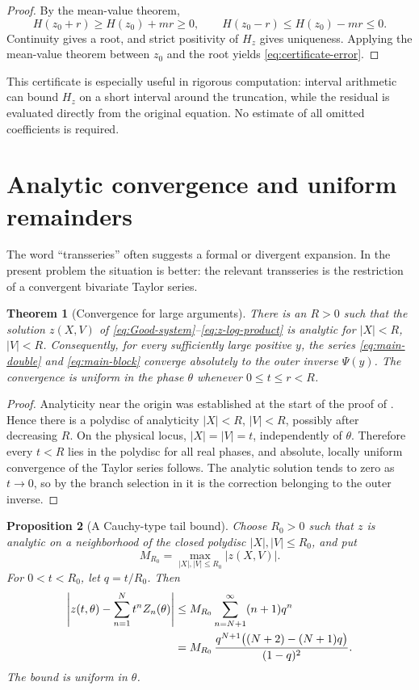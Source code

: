 \documentclass[11pt,oneside]{article}
\theoremstyle{plain}
\newtheorem{theorem}{Theorem}[section]
\newtheorem{proposition}[theorem]{Proposition}
\theoremstyle{definition}
\theoremstyle{remark}
\newcommand{\abs}[1]{\left\lvert#1\right\rvert}
\begin{document}
\begin{proof}
By the mean-value theorem,
\[
 H(z_0+r)\ge H(z_0)+mr\ge0,
 \qquad
 H(z_0-r)\le H(z_0)-mr\le0.
\]
Continuity gives a root, and strict positivity of \(H_z\) gives uniqueness.
Applying the mean-value theorem between \(z_0\) and the root yields
\eqref{eq:certificate-error}.
\end{proof}

This certificate is especially useful in rigorous computation: interval
arithmetic can bound \(H_z\) on a short interval around the truncation, while
the residual is evaluated directly from the original equation.  No estimate
of all omitted coefficients is required.

\section{Analytic convergence and uniform remainders}
\label{sec:convergence}

The word ``transseries'' often suggests a formal or divergent expansion.  In
the present problem the situation is better: the relevant transseries is the
restriction of a convergent bivariate Taylor series.

\begin{theorem}[Convergence for large arguments]
\label{thm:convergence}
There is an \(R>0\) such that the solution \(z(X,V)\) of
\eqref{eq:Good-system}--\eqref{eq:z-log-product} is analytic for
\(\abs X<R\), \(\abs V<R\).  Consequently, for every sufficiently large
positive \(y\), the series \eqref{eq:main-double} and
\eqref{eq:main-block} converge absolutely to the outer inverse \(\Psi(y)\).
The convergence is uniform in the phase \(\theta\) whenever
\(0\le t\le r<R\).
\end{theorem}

\begin{proof}
Analyticity near the origin was established at the start of the proof of
.  Hence there is a polydisc of analyticity
\(\abs X<R\), \(\abs V<R\), possibly after decreasing \(R\).  On the physical
locus, \(\abs X=\abs V=t\), independently of \(\theta\).  Therefore every
\(t<R\) lies in the polydisc for all real phases, and absolute, locally uniform
convergence of the Taylor series follows.  The analytic solution tends to
zero as \(t\to0\), so by the branch selection in
 it is the correction belonging to the outer
inverse.
\end{proof}

\begin{proposition}[A Cauchy-type tail bound]
\label{prop:Cauchy-tail}
Choose \(R_0>0\) such that \(z\) is analytic on a neighborhood of the closed
polydisc \(\abs X,\abs V\le R_0\), and put
\[
 M_{R_0}=\max_{\abs X,\abs V\le R_0}\abs{z(X,V)}.
\]
For \(0<t<R_0\), let \(q=t/R_0\).  Then
\begin{align}
 \left|z(t,\theta)-\sum_{n=1}^Nt^nZ_n(\theta)\right|
 &\le M_{R_0}\sum_{n=N+1}^{\infty}(n+1)q^n \notag\\
 &=M_{R_0}\,
 \frac{q^{N+1}\bigl((N+2)-(N+1)q\bigr)}{(1-q)^2}.
 \label{eq:Cauchy-tail}
\end{align}
The bound is uniform in \(\theta\).
\end{proposition}
\end{document}
